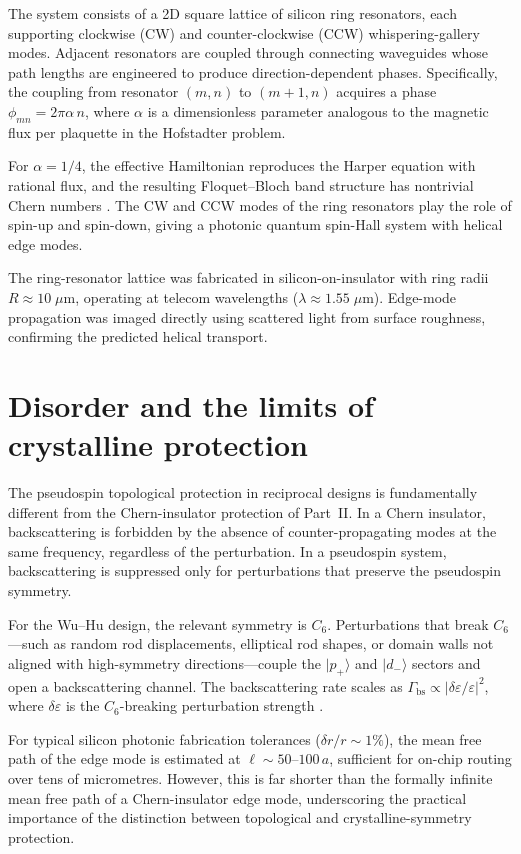 The system consists of a 2D square lattice of silicon ring resonators,
each supporting clockwise (CW) and counter-clockwise (CCW) whispering-gallery
modes.  Adjacent resonators are coupled through connecting waveguides
whose path lengths are engineered to produce direction-dependent phases.
Specifically, the coupling from resonator $(m,n)$ to $(m+1,n)$ acquires
a phase $\phi_{mn}=2\pi\alpha\,n$, where $\alpha$ is a dimensionless
parameter analogous to the magnetic flux per plaquette in the Hofstadter
problem.

For $\alpha=1/4$, the effective Hamiltonian reproduces the Harper
equation with rational flux, and the resulting Floquet--Bloch band
structure has nontrivial Chern numbers \cite{ozawa2018topological}.
The CW and CCW modes of the ring resonators play the role of spin-up
and spin-down, giving a photonic quantum spin-Hall system with helical
edge modes.

The ring-resonator lattice was fabricated in silicon-on-insulator with
ring radii $R\approx 10\;\mu\mathrm{m}$, operating at telecom
wavelengths ($\lambda\approx 1.55\;\mu\mathrm{m}$).  Edge-mode
propagation was imaged directly using scattered light from surface
roughness, confirming the predicted helical transport.

\section{Disorder and the limits of crystalline protection}
\label{sec:ch11-disorder}

The pseudospin topological protection in reciprocal designs is
fundamentally different from the Chern-insulator protection of
Part~II.  In a Chern insulator, backscattering is forbidden by
the absence of counter-propagating modes at the same frequency,
regardless of the perturbation.  In a pseudospin system,
backscattering is suppressed only for perturbations that preserve
the pseudospin symmetry.

For the Wu--Hu design, the relevant symmetry is $C_6$.  Perturbations
that break $C_6$---such as random rod displacements, elliptical rod
shapes, or domain walls not aligned with high-symmetry
directions---couple the $|p_+\rangle$ and $|d_-\rangle$ sectors and
open a backscattering channel.  The backscattering rate scales as
$\Gamma_{\mathrm{bs}}\propto|\delta\varepsilon/\varepsilon|^2$,
where $\delta\varepsilon$ is the $C_6$-breaking perturbation
strength \cite{price2022roadmap}.

For typical silicon photonic fabrication tolerances
($\delta r/r\sim 1\%$), the mean free path of the edge mode is
estimated at $\ell\sim 50$--$100\,a$, sufficient for on-chip routing
over tens of micrometres.  However, this is far shorter than the
formally infinite mean free path of a Chern-insulator edge mode,
underscoring the practical importance of the distinction between
topological and crystalline-symmetry protection.

